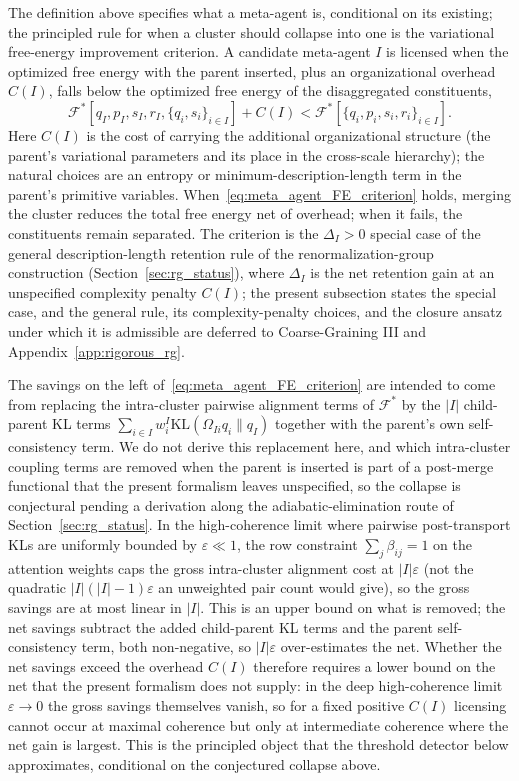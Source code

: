 \documentclass[11pt]{article}
\begin{document}
The definition above specifies what a meta-agent is, conditional on its existing; the principled rule for when a cluster should collapse into one is the variational free-energy improvement criterion. A candidate meta-agent $I$ is licensed when the optimized free energy with the parent inserted, plus an organizational overhead $C(I)$, falls below the optimized free energy of the disaggregated constituents,
\begin{equation}
\mathcal{F}^*[q_I, p_I, s_I, r_I, \{q_i, s_i\}_{i \in I}] + C(I) < \mathcal{F}^*[\{q_i, p_i, s_i, r_i\}_{i \in I}].
\label{eq:meta_agent_FE_criterion}
\end{equation}
Here $C(I)$ is the cost of carrying the additional organizational structure (the parent's variational parameters and its place in the cross-scale hierarchy); the natural choices are an entropy or minimum-description-length term in the parent's primitive variables. When~\eqref{eq:meta_agent_FE_criterion} holds, merging the cluster reduces the total free energy net of overhead; when it fails, the constituents remain separated. The criterion is the $\Delta_I > 0$ special case of the general description-length retention rule of the renormalization-group construction (Section~\ref{sec:rg_status}), where $\Delta_I$ is the net retention gain at an unspecified complexity penalty $C(I)$; the present subsection states the special case, and the general rule, its complexity-penalty choices, and the closure ansatz under which it is admissible are deferred to Coarse-Graining III and Appendix~\ref{app:rigorous_rg}.

The savings on the left of~\eqref{eq:meta_agent_FE_criterion} are intended to come from replacing the intra-cluster pairwise alignment terms of $\mathcal{F}^*$ by the $|I|$ child-parent KL terms $\sum_{i \in I} w_i^I \mathrm{KL}(\Omega_{Ii}q_i \| q_I)$ together with the parent's own self-consistency term. We do not derive this replacement here, and which intra-cluster coupling terms are removed when the parent is inserted is part of a post-merge functional that the present formalism leaves unspecified, so the collapse is conjectural pending a derivation along the adiabatic-elimination route of Section~\ref{sec:rg_status}. In the high-coherence limit where pairwise post-transport KLs are uniformly bounded by $\varepsilon \ll 1$, the row constraint $\sum_j \beta_{ij} = 1$ on the attention weights caps the gross intra-cluster alignment cost at $|I|\varepsilon$ (not the quadratic $|I|(|I|-1)\varepsilon$ an unweighted pair count would give), so the gross savings are at most linear in $|I|$. This is an upper bound on what is removed; the net savings subtract the added child-parent KL terms and the parent self-consistency term, both non-negative, so $|I|\varepsilon$ over-estimates the net. Whether the net savings exceed the overhead $C(I)$ therefore requires a lower bound on the net that the present formalism does not supply: in the deep high-coherence limit $\varepsilon \to 0$ the gross savings themselves vanish, so for a fixed positive $C(I)$ licensing cannot occur at maximal coherence but only at intermediate coherence where the net gain is largest. This is the principled object that the threshold detector below approximates, conditional on the conjectured collapse above.
\end{document}
